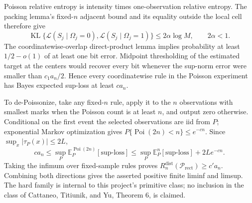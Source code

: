 Poisson relative entropy is intensity times one-observation relative entropy.  The packing lemma's fixed-\(n\) adjacent bound and its equality outside the local cell therefore give
\[
\operatorname{KL}\{\mathcal L(S_j\mid\Omega_j=0),\mathcal L(S_j\mid\Omega_j=1)\}
\leq2\alpha\log M,
\qquad 2\alpha<1.
\]
The coordinatewise-overlap direct-product lemma implies probability at least \(1/2-o(1)\) of at least one bit error.  Midpoint thresholding of the estimated target at the centers would recover every bit whenever the sup-norm error were smaller than \(c_1a_n/2\).  Hence every coordinatewise rule in the Poisson experiment has Bayes expected sup-loss at least \(ca_n\).

To de-Poissonize, take any fixed-\(n\) rule, apply it to the \(n\) observations with smallest marks when the Poisson count is at least \(n\), and output zero otherwise.  Conditional on the first event the selected observations are iid from \(P\); exponential Markov optimization gives \(P\{\operatorname{Poi}(2n)<n\}\leq e^{-cn}\).  Since \(\sup_x|\tau_P(x)|\leq2L\),
\[
ca_n\leq\sup_P\mathbb E_P^{\operatorname{Poi}(2n)}[\text{sup-loss}]
\leq\sup_P\mathbb E_P^n[\text{sup-loss}]+2Le^{-cn}.
\]
Taking the infimum over fixed-sample rules proves \(R_n^{\mathrm{dist}}(\mathcal P_{\mathrm{rect}})\geq c'a_n\).  Combining both directions gives the asserted positive finite liminf and limsup.  The hard family is internal to this project's primitive class; no inclusion in the class of Cattaneo, Titiunik, and Yu, Theorem 6, is claimed.